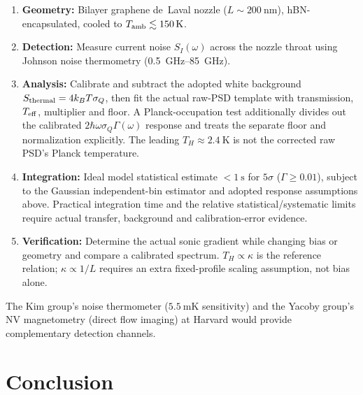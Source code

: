 \documentclass[aps,prd,twocolumn,showpacs,superscriptaddress,nofootinbib]{revtex4-2}
\begin{document}
\begin{enumerate}
\item \textbf{Geometry:} Bilayer graphene de~Laval nozzle
($L \sim \SI{200}{\nano\meter}$), hBN-encapsulated, cooled to
$T_{\rm amb} \lesssim \SI{150}{\kelvin}$.

\item \textbf{Detection:} Measure current noise $S_I(\omega)$ across the
nozzle throat using Johnson noise thermometry
(\SIrange{0.5}{85}{\giga\hertz}).

\item \textbf{Analysis:} Calibrate and subtract the adopted white
background $S_{\rm thermal}=4k_BT\sigma_Q$, then fit the actual
raw-PSD template with transmission, $T_{\rm eff}$, multiplier and
floor. A Planck-occupation test additionally divides out the calibrated
$2\hbar\omega\sigma_Q\Gamma(\omega)$ response and treats the
separate floor and normalization explicitly. The leading
$T_H\approx\SI{2.4}{\kelvin}$ is not the corrected raw PSD's
Planck temperature.

\item \textbf{Integration:} Ideal model statistical estimate
$< \SI{1}{\second}$ for $5\sigma$ ($\Gamma \geq 0.01$), subject to the
Gaussian independent-bin estimator and adopted response assumptions above.
Practical integration time and the relative statistical/systematic limits
require actual transfer, background and calibration-error evidence.

\item \textbf{Verification:} Determine the actual sonic gradient
while changing bias or geometry and compare a calibrated spectrum.
$T_H\propto\kappa$ is the reference relation; $\kappa\propto1/L$
requires an extra fixed-profile scaling assumption, not bias alone.
\end{enumerate}

The Kim group's noise thermometer ($\SI{5.5}{\milli\kelvin}$ sensitivity)
and the Yacoby group's NV magnetometry (direct flow imaging) at Harvard
would provide complementary detection channels.

\section{Conclusion}
\end{document}
